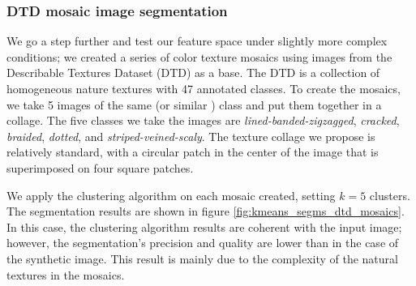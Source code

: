 \subsubsection{DTD mosaic image segmentation}
We go a step further and test our feature space under slightly more complex conditions; we created a series of color texture mosaics using images from the Describable Textures Dataset (DTD) \citep{Cimpoi.Maji.ea:CVPR:2014} as a base. The DTD is a collection of homogeneous nature textures with 47 annotated classes. To create the mosaics, we take 5 images of the same (or similar ) class and put them together in a collage. The five classes we take the images are \textit{lined-banded-zigzagged}, \textit{cracked}, \textit{braided}, \textit{dotted}, and \textit{striped-veined-scaly}. The texture collage we propose is relatively standard, with a circular patch in the center of the image that is superimposed on four square patches. 

We apply the clustering algorithm on each mosaic created, setting $ k = 5 $ clusters. The segmentation results are shown in figure \ref{fig:kmeans_segms_dtd_mosaics}. In this case, the clustering algorithm results are coherent with the input image; however, the segmentation's precision and quality are lower than in the case of the synthetic image. This result is mainly due to the complexity of the natural textures in the mosaics. 

